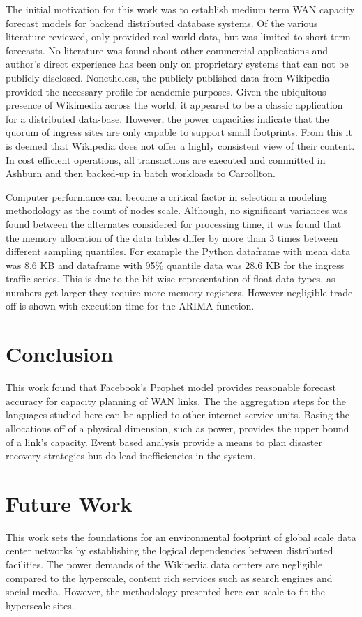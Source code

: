 \documentclass[conference]{IEEEtran}
\begin{document}
The initial motivation for this work was to establish medium term WAN capacity forecast models for backend distributed database systems. Of the various literature reviewed, only \cite{Zhuang} provided real world data, but was limited to short term forecasts. No literature was found about other commercial applications and author's direct experience has been only on proprietary systems that can not be publicly disclosed. Nonetheless, the publicly published data from Wikipedia provided the necessary  profile for academic purposes. Given the ubiquitous presence of Wikimedia across the world, it appeared to be a classic application for a distributed data-base. However, the power capacities indicate that the quorum of ingress sites are only capable to support small footprints. From this it is deemed that Wikipedia does not offer a highly consistent view of their content. In cost efficient operations, all transactions are executed and committed in Ashburn and then backed-up in batch workloads to Carrollton.

Computer performance can become a critical factor in selection a modeling methodology as the count of nodes scale. Although, no significant variances was found between the alternates considered for processing time, it was found that the memory allocation of the data tables differ by more than 3 times between different sampling quantiles. For example the Python dataframe with mean data was 8.6 KB and dataframe with 95\% quantile data was 28.6 KB for the ingress traffic series. This is due to the bit-wise representation of float data types, as numbers get larger they require more memory registers. However negligible trade-off is shown with  execution time for the ARIMA function.   

\section{Conclusion}

This work found that Facebook's Prophet model provides reasonable forecast accuracy for capacity planning of WAN links. The the aggregation steps for the languages studied here can be applied to other internet service units. Basing the allocations off of a physical dimension, such as power, provides the upper bound of a link's capacity. Event based analysis provide a means to plan disaster recovery strategies but do lead inefficiencies in the system.

\section{Future Work}
This work sets the foundations for an environmental footprint of global scale data center networks by establishing the logical dependencies between distributed facilities. The power demands of the Wikipedia data centers are negligible compared to the hyperscale, content rich services such as search engines and social media. However, the methodology presented here can scale to fit the hyperscale sites.
\end{document}
